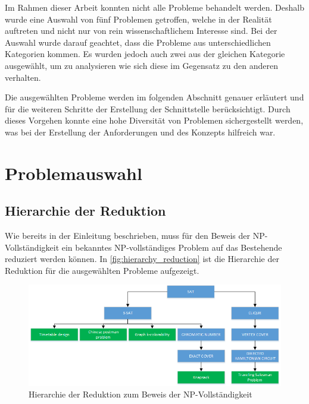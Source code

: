 Im Rahmen dieser Arbeit konnten nicht alle Probleme behandelt werden. Deshalb wurde eine Auswahl von fünf Problemen getroffen, welche in der Realität auftreten und nicht nur von rein 
wissenschaftlichem Interesse sind. Bei der Auswahl wurde darauf geachtet, dass die Probleme aus unterschiedlichen Kategorien kommen. Es wurden jedoch auch zwei aus der gleichen 
Kategorie ausgewählt, um zu analysieren wie sich diese im Gegensatz zu den anderen verhalten. 

Die ausgewählten Probleme werden im folgenden Abschnitt genauer erläutert und für die weiteren Schritte der Erstellung der Schnittstelle berücksichtigt. Durch dieses Vorgehen konnte eine 
hohe Diversität von Problemen sichergestellt werden, was bei der Erstellung der Anforderungen und des Konzepts hilfreich war.

\section{Problemauswahl}\label{cat_theo_inf}

\subsection{Hierarchie der Reduktion}\label{hierarchy_reduction}
Wie bereits in der Einleitung beschrieben, muss für den Beweis der NP-Vollständigkeit ein bekanntes NP-vollständiges Problem auf das Bestehende reduziert werden können. In 
\autoref{fig:hierarchy_reduction} ist die Hierarchie der Reduktion für die ausgewählten Probleme aufgezeigt.

\begin{figure}[h]
\centering 
\includegraphics[scale=0.75]{images/visio/problem_hierarchy.png}
\caption[Hierarchie der Reduktion zum Beweis der NP-Vollständigkeit]{Hierarchie der Reduktion zum Beweis der NP-Vollständigkeit }
\label{fig:hierarchy_reduction}
\end{figure}

